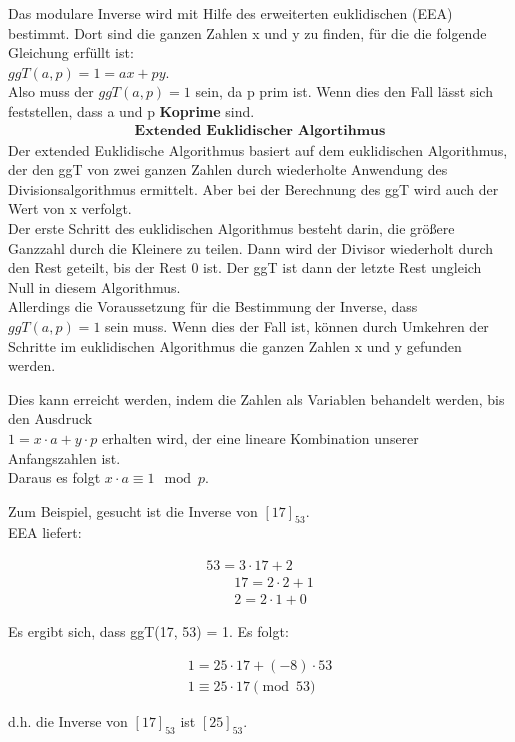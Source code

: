 Das modulare Inverse wird mit Hilfe des erweiterten euklidischen (EEA) bestimmt.
Dort sind die ganzen Zahlen x und y zu finden, für die die folgende Gleichung erfüllt ist: \\
$ ggT (a, p) = 1 = ax + py $. \\
Also muss der $ ggT (a, p) = 1 $ sein, da p prim ist. Wenn dies den Fall lässt sich feststellen, dass a und p \textbf{Koprime} sind.
\begin{align*}
    \textbf{Extended Euklidischer Algortihmus}
\end{align*}
Der extended Euklidische Algorithmus basiert auf dem euklidischen Algorithmus, der den ggT von zwei ganzen Zahlen durch wiederholte Anwendung des Divisionsalgorithmus ermittelt. Aber bei der Berechnung des ggT wird auch der Wert von x verfolgt. \\

Der erste Schritt des euklidischen Algorithmus besteht darin, die größere Ganzzahl durch die Kleinere zu teilen. Dann wird der Divisor wiederholt durch den Rest geteilt, bis der Rest 0 ist. Der ggT ist dann der letzte Rest ungleich Null in diesem Algorithmus. \\
Allerdings die Voraussetzung für die Bestimmung der Inverse, dass $ ggT(a, p) = 1 $ sein muss. 
Wenn dies der Fall ist, können durch Umkehren der Schritte im euklidischen Algorithmus die ganzen Zahlen x und y gefunden werden.

Dies kann erreicht werden, indem die Zahlen als Variablen behandelt werden, bis den Ausdruck \\
\(1 = x \cdot a + y \cdot p \) erhalten wird, der eine lineare Kombination unserer Anfangszahlen ist. \\
Daraus es folgt \( x \cdot a \equiv 1 \mod p \). 

Zum Beispiel, gesucht ist die Inverse von $[17]_{53}$. \\
EEA liefert:
\begin{ceqn}
\begin{align*}
              53 = 3 \cdot 17 + 2 \\
    \qquad    17 = 2 \cdot 2 + \boxed{1}   \\
    \qquad    2 = 2 \cdot 1 + 0
\end{align*}
\end{ceqn}
Es ergibt sich, dass ggT(17, 53) = 1. Es folgt: \\ 

\begin{ceqn}
\begin{align*}
              1 = 25 \cdot 17 + (-8) \cdot 53 \\
              1 \equiv 25 \cdot 17 \pmod 53
\end{align*}
\end{ceqn}
d.h. die Inverse von $[17]_{53}$ ist $[25]_{53}$. \\

